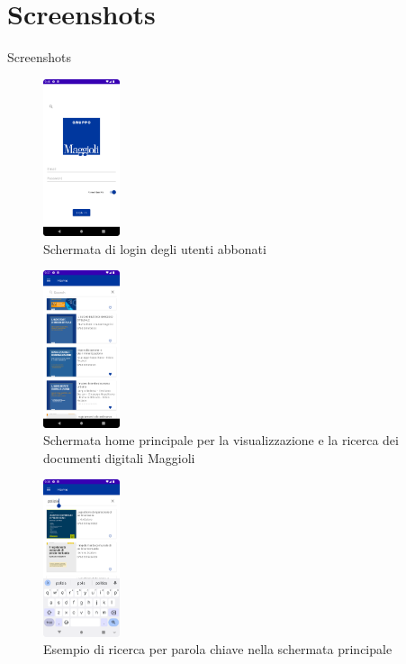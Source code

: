 \documentclass[10pt]{beamer}
\begin{document}
\section{Screenshots}
    \begin{frame}{Screenshots}
        \begin{multicols}{3}
            \begin{figure}[H]
                \includegraphics[width=0.2\textwidth]{login.png}
                \caption{Schermata di login degli utenti abbonati}
                \label{login}
            \end{figure}
            
            \begin{figure}[H]
                \includegraphics[width=0.2\textwidth]{home.png}
                \caption{Schermata home principale per la visualizzazione e la ricerca dei documenti digitali Maggioli}
                \label{home}
            \end{figure}
            
            \begin{figure}[H]
                \includegraphics[width=0.2\textwidth]{ricerca.png}
                \caption{Esempio di ricerca per parola chiave nella schermata principale}
                \label{ricerca}
            \end{figure}
        \end{multicols}
    \end{frame}
\end{document}
